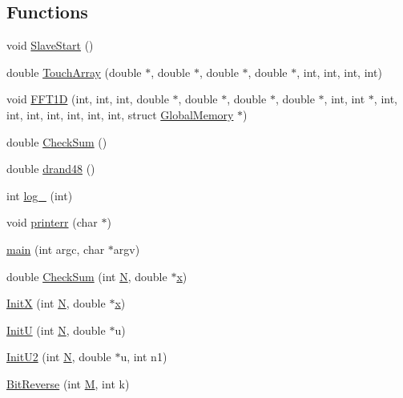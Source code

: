 \subsection*{Functions}
\begin{DoxyCompactItemize}
\item 
void \hyperlink{fft_8C_ae6bcaa881a85c5bc360884a266ba7a48}{Slave\+Start} ()
\item 
double \hyperlink{fft_8C_a05c06b357a7c94983b0b5595ec483d49}{Touch\+Array} (double $\ast$, double $\ast$, double $\ast$, double $\ast$, int, int, int, int)
\item 
void \hyperlink{fft_8C_a288e18636d2be3d008f12b44db70f323}{F\+F\+T1\+D} (int, int, int, double $\ast$, double $\ast$, double $\ast$, double $\ast$, int, int $\ast$, int, int, int, int, int, int, int, struct \hyperlink{structGlobalMemory}{Global\+Memory} $\ast$)
\item 
double \hyperlink{fft_8C_adbf16cb09423a83607a647e9316fb8a3}{Check\+Sum} ()
\item 
double \hyperlink{fft_8C_a0556ac4bd80375e8a98d85ae0f1b4486}{drand48} ()
\item 
int \hyperlink{fft_8C_a89fa0b48e4d41d891cc11bb60c47b811}{log\+\_} (int)
\item 
void \hyperlink{fft_8C_a2297374ee04f814e4f1dde15817d76e0}{printerr} (char $\ast$)
\item 
\hyperlink{fft_8C_a386d026281190375f6ce7c366d48931a}{main} (int argc, char $\ast$argv)
\item 
double \hyperlink{fft_8C_aece45dc7ebe959b213c3e91da5eecefa}{Check\+Sum} (int \hyperlink{fft_8C_a7722c8ecbb62d99aee7ce68b1752f337}{N}, double $\ast$\hyperlink{fft_8C_a711aad4cbe735871dd9e91ab575c878b}{x})
\item 
\hyperlink{fft_8C_ae08491a7b631376d51c872f152d699ed}{Init\+X} (int \hyperlink{fft_8C_a7722c8ecbb62d99aee7ce68b1752f337}{N}, double $\ast$\hyperlink{fft_8C_a711aad4cbe735871dd9e91ab575c878b}{x})
\item 
\hyperlink{fft_8C_ae54c123f4f2c3ce0e7d65f932ba2604b}{Init\+U} (int \hyperlink{fft_8C_a7722c8ecbb62d99aee7ce68b1752f337}{N}, double $\ast$u)
\item 
\hyperlink{fft_8C_aa01c0806ec248364cef3245cb98c055a}{Init\+U2} (int \hyperlink{fft_8C_a7722c8ecbb62d99aee7ce68b1752f337}{N}, double $\ast$u, int n1)
\item 
\hyperlink{fft_8C_ac6a2d1e9a54f1dd85f648c13068c1ad4}{Bit\+Reverse} (int \hyperlink{fft_8C_a5e78dbd5fd0fc01ba7b98dd15e27221e}{M}, int k)
\item 

\end{DoxyCompactItemize}
